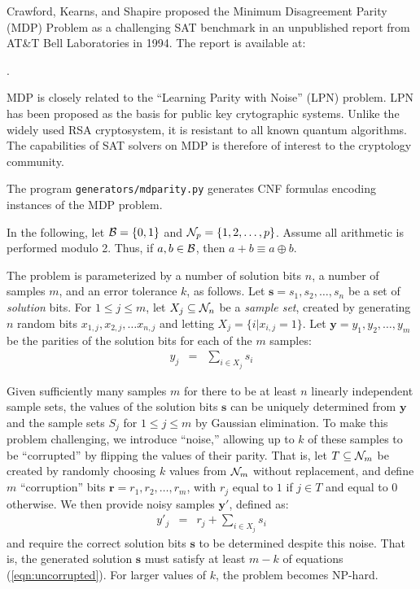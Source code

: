 Crawford, Kearns, and Shapire proposed the Minimum Disagreement Parity (MDP)
Problem as a challenging SAT benchmark in an unpublished report from
AT\&T Bell Laboratories in 1994.  The report is available at:
\begin{center}
.
\end{center}

MDP is closely related to the ``Learning Parity with Noise'' (LPN)
problem.  LPN has been proposed as the basis for public key
crytographic systems.  Unlike the widely used
RSA cryptosystem, it is resistant to all known quantum
algorithms.  The capabilities of SAT
solvers on MDP is therefore of interest to the cryptology community.

The program \texttt{generators/mdparity.py} generates CNF formulas
encoding instances of the MDP problem.

In the following, let ${\cal B} = \{0, 1\}$ and ${\cal N}_{p} = \{1, 2, \ldots, p\}$.
Assume all arithmetic is performed modulo 2.  Thus,
if $a, b \in {\cal B}$, then $a+b \equiv a \oplus b$.

The problem is parameterized by a number of solution bits $n$, a
number of samples $m$, and an error tolerance $k$, as follows.  Let
$\bm{s} = s_1, s_2, \ldots, s_n$ be a set of {\em solution} bits.
For $1 \leq j \leq m$, let $X_j \subseteq {\cal N}_{n}$
be a {\em sample set}, created by generating $n$
random bits $x_{1,j}, x_{2,j}, \ldots x_{n,j}$
and letting $X_j = \{i | x_{i,j} = 1 \}$.  Let $\bm{y} = y_1, y_2, \ldots, y_m$ be the
parities of the solution bits for each of the $m$ samples:
\begin{eqnarray}
y_j & = & \sum_{i \in X_j} s_i \label{eqn:uncorrupted}
\end{eqnarray}

Given sufficiently many samples $m$ for there to be at least $n$ linearly
independent sample sets, the values of the solution bits $\bm{s}$ can
be uniquely determined from $\bm{y}$ and the sample sets $S_j$ for
$1 \leq j \leq m$ by Gaussian elimination.  To make this problem
challenging, we introduce ``noise,'' allowing up to $k$ of these
samples to be ``corrupted'' by flipping the values of their parity.
That is, let $T \subseteq {\cal N}_{m}$ be created by randomly choosing
$k$ values from ${\cal N}_{m}$ without replacement, and define $m$
``corruption'' bits $\bm{r} = r_1, r_2, \ldots, r_m$, with $r_j$ equal
to $1$ if $j \in T$ and equal to $0$ otherwise.  
We then provide noisy samples $\bm{y}'$, defined as:
\begin{eqnarray}
y'_j & = & r_j + \sum_{i \in X_j} s_i \label{eqn:corrupted}
\end{eqnarray}
and require the correct solution bits $\bm{s}$ to be determined despite this noise.  That is, the generated solution $\bm{s}$ must satisfy at least $m-k$ of equations (\ref{eqn:uncorrupted}).
For larger values of $k$, the
problem becomes NP-hard.

